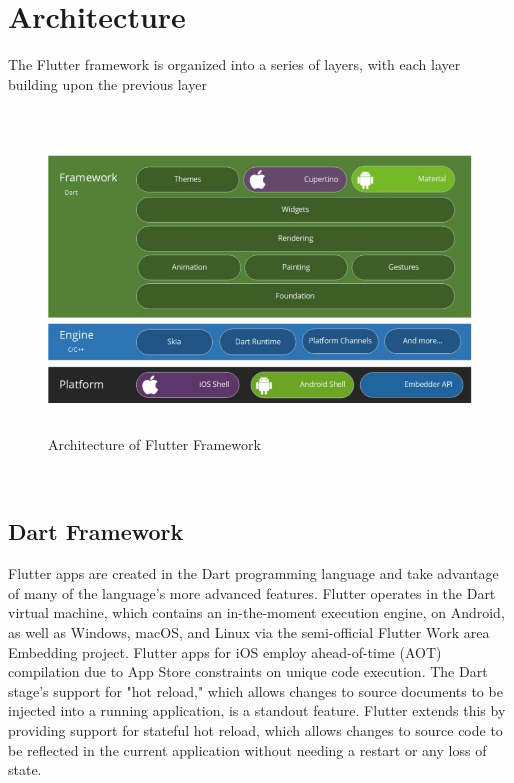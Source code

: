 \chapter{Architecture}

The Flutter framework is organized into a series of layers, with each layer building upon the previous layer\\\\
\begin{figure}[h]
  \begin{center}
  \includegraphics[height=80mm]{Images & Logos/CH_02_architecture.jpg}
  \end{center}
  \caption{Architecture of Flutter Framework}
\end{figure}\\  
  




\section{Dart Framework}

Flutter apps are created in the Dart programming language and take advantage of many of the language's more advanced features. Flutter operates in the Dart virtual machine, which contains an in-the-moment execution engine, on Android, as well as Windows, macOS, and Linux via the semi-official Flutter Work area Embedding project. Flutter apps for iOS employ ahead-of-time (AOT) compilation due to App Store constraints on unique code execution.
The Dart stage's support for "hot reload," which allows changes to source documents to be injected into a running application, is a standout feature. Flutter extends this by providing support for stateful hot reload, which allows changes to source code to be reflected in the current application without needing a restart or any loss of state.

